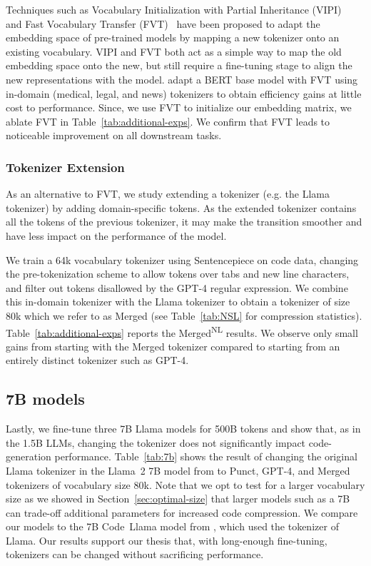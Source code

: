 Techniques such as Vocabulary Initialization with Partial Inheritance (VIPI)~\cite{vipi} and Fast Vocabulary Transfer (FVT)~\cite{FVT} have been proposed to adapt the embedding space of pre-trained models by mapping a new tokenizer onto an existing vocabulary. VIPI and FVT both act as a simple way to map the old embedding space onto the new, but still require a fine-tuning stage to align the new representations with the model.
\citet{FVT} adapt a BERT base model \cite{bert} with FVT using in-domain (medical, legal, and news) tokenizers to obtain efficiency gains at little cost to performance. Since, we use FVT to initialize our embedding matrix, we ablate FVT in Table~\ref{tab:additional-exps}.
We confirm that FVT leads to noticeable improvement on all downstream tasks.

\subsubsection{Tokenizer Extension}

As an alternative to FVT, we study extending a tokenizer (e.g. the Llama tokenizer) by adding domain-specific tokens. As the extended tokenizer contains all the tokens of the previous tokenizer, it may make the transition smoother and have less impact on the performance of the model.

We train a 64k vocabulary tokenizer using Sentencepiece on code data, changing the pre-tokenization scheme to allow tokens over tabs and new line characters, and filter out tokens disallowed by the GPT-4 regular expression. We combine this in-domain tokenizer with the Llama tokenizer to obtain a tokenizer of size 80k which we refer to as Merged (see Table~\ref{tab:NSL} for compression statistics).
Table~\ref{tab:additional-exps} reports the Merged\textsuperscript{NL} results. We observe only small gains from starting with the Merged tokenizer compared to starting from an entirely distinct tokenizer such as GPT-4.

\subsection{7B models}

Lastly, we fine-tune three 7B Llama models for 500B tokens and show that, as in the 1.5B LLMs, changing the tokenizer does not significantly impact code-generation performance.
Table~\ref{tab:7b} shows the result of changing the original Llama tokenizer in the Llama~2 7B model from \citet{touvron2023llama2} to Punct, GPT-4, and Merged tokenizers of vocabulary size 80k. Note that we opt to test for a larger vocabulary size as we showed in Section~\ref{sec:optimal-size} that larger models such as a 7B can trade-off additional parameters for increased code compression. We compare our models to the 7B Code~Llama model from \citet{roziere2023code}, which used the tokenizer of Llama. Our results support our thesis that, with long-enough fine-tuning, tokenizers can be changed without sacrificing performance.

